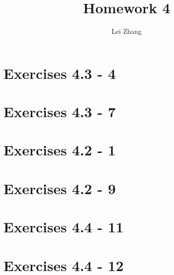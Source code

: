 \documentclass{article}
\title{Homework 4}
\author{Lei Zhang}
\begin{document}
\maketitle

\section{Exercises 4.3 - 4}

\section{Exercises 4.3 - 7}

\section{Exercises 4.2 - 1}



\section{Exercises 4.2 - 9}

\section{Exercises 4.4 - 11}

\section{Exercises 4.4 - 12}
\end{document}
